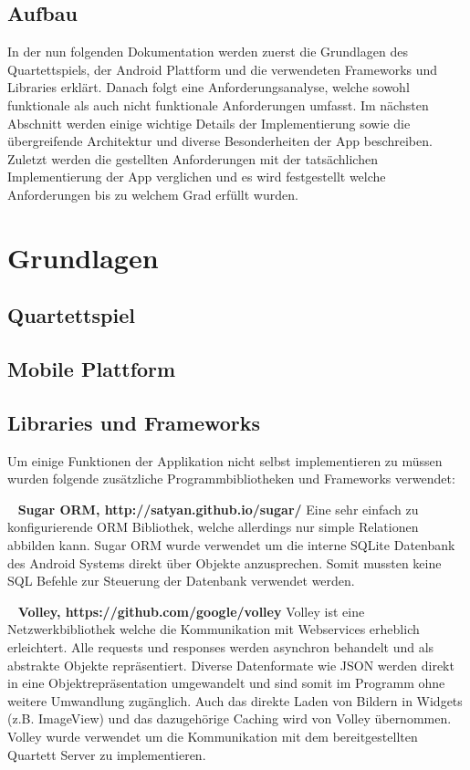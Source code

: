 \documentclass{scrartcl}
\begin{document}
\subsection{Aufbau}

In der nun folgenden Dokumentation werden zuerst die Grundlagen des
Quartettspiels, der Android Plattform und die verwendeten Frameworks und
Libraries erklärt. Danach folgt eine Anforderungsanalyse, welche sowohl
funktionale als auch nicht funktionale Anforderungen umfasst. Im nächsten
Abschnitt werden einige wichtige Details der Implementierung sowie die
übergreifende Architektur und diverse Besonderheiten der App beschreiben.
Zuletzt werden die gestellten Anforderungen mit der tatsächlichen
Implementierung der App verglichen und es wird festgestellt welche Anforderungen
bis zu welchem Grad erfüllt wurden.

\section{Grundlagen}
\subsection{Quartettspiel}
\subsection{Mobile Plattform}
\subsection{Libraries und Frameworks}
Um einige Funktionen der Applikation nicht selbst implementieren zu müssen
wurden folgende zusätzliche Programmbibliotheken und Frameworks verwendet:

\noindent
\ \newline
\textbf{Sugar ORM, http://satyan.github.io/sugar/} \newline
Eine sehr einfach zu konfigurierende ORM Bibliothek, welche allerdings nur
simple Relationen abbilden kann. Sugar ORM wurde verwendet um die interne SQLite
Datenbank des Android Systems direkt über Objekte anzusprechen. Somit mussten
keine SQL Befehle zur Steuerung der Datenbank verwendet werden.

\ \newline
\textbf{Volley, https://github.com/google/volley} \newline
Volley ist eine Netzwerkbibliothek welche die Kommunikation mit Webservices
erheblich erleichtert. Alle requests und responses werden asynchron behandelt
und als abstrakte Objekte repräsentiert. Diverse Datenformate wie JSON werden
direkt in eine Objektrepräsentation umgewandelt und sind somit im Programm ohne
weitere Umwandlung zugänglich. Auch das direkte Laden von Bildern in Widgets
(z.B. ImageView) und das dazugehörige Caching wird von Volley übernommen. Volley
wurde verwendet um die Kommunikation mit dem bereitgestellten Quartett Server zu
implementieren.
\end{document}
